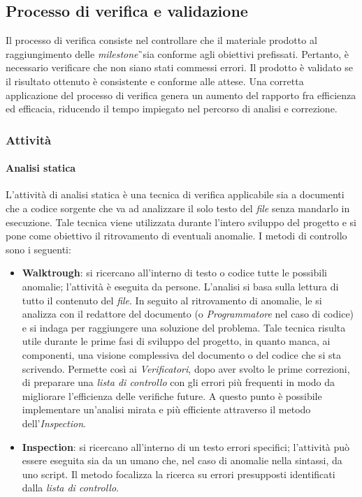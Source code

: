 \subsection{Processo di verifica e validazione}
Il processo di verifica consiste nel controllare che il materiale prodotto al raggiungimento delle \textit{milestone}\G\ sia conforme agli obiettivi prefissati. Pertanto, è necessario verificare che non siano stati commessi errori. Il prodotto è validato se il risultato ottenuto è consistente e conforme alle attese. Una corretta applicazione del processo di verifica genera un aumento del rapporto fra efficienza ed efficacia, riducendo il tempo impiegato nel percorso di analisi e correzione.
\subsubsection{Attività}
\paragraph{Analisi statica}
L'attività di analisi statica è una tecnica di verifica applicabile sia a documenti che a codice sorgente che va ad analizzare il solo testo del \textit{file} senza mandarlo in esecuzione. Tale tecnica viene utilizzata durante l'intero sviluppo del progetto e si pone come obiettivo il ritrovamento di eventuali anomalie. I metodi di controllo sono i seguenti:
\begin{itemize}
	\item \textbf{Walktrough}: si ricercano all'interno di testo o codice tutte le possibili anomalie; l'attività è eseguita da persone. L'analisi si basa sulla lettura di tutto il contenuto del \textit{file}. In seguito al ritrovamento di anomalie, le si analizza con il redattore del documento (o \textit{Programmatore} nel caso di codice) e si indaga per raggiungere una soluzione del problema. Tale tecnica risulta utile durante le prime fasi di sviluppo del progetto, in quanto manca, ai componenti, una visione complessiva del documento o del codice che si sta scrivendo. Permette così ai \textit{Verificatori}, dopo aver svolto le prime correzioni, di preparare una \textit{lista di controllo} con gli errori più frequenti in modo da migliorare l'efficienza delle verifiche future. A questo punto è possibile implementare un'analisi mirata e più efficiente attraverso il metodo dell'\textit{Inspection}.
	\item \textbf{Inspection}: si ricercano all'interno di un testo errori specifici; l'attività può essere eseguita sia da un umano che, nel caso di anomalie nella sintassi, da uno script. Il metodo focalizza la ricerca su errori presupposti identificati dalla \textit{lista di controllo}.
\end{itemize}
